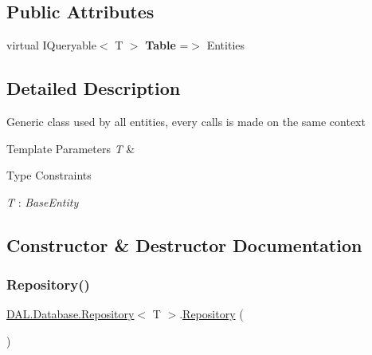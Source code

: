 \subsection*{Public Attributes}
\begin{DoxyCompactItemize}
\item 
\mbox{\label{class_d_a_l_1_1_database_1_1_repository_abb10bb5517401514b62f812635f9fcc1}} 
virtual I\+Queryable$<$ T $>$ {\bfseries Table} =$>$ Entities
\end{DoxyCompactItemize}


\subsection{Detailed Description}
Generic class used by all entities, every calls is made on the same context 


\begin{DoxyTemplParams}{Template Parameters}
{\em T} & \\
\hline
\end{DoxyTemplParams}
\begin{Desc}
\item[Type Constraints]\begin{description}
\item[{\em T} : {\em Base\+Entity}]\end{description}
\end{Desc}


\subsection{Constructor \& Destructor Documentation}
\mbox{\label{class_d_a_l_1_1_database_1_1_repository_a937df992bda81edb925ddc7ffd731f0c}} 
\subsubsection{\texorpdfstring{Repository()}{Repository()}}
{\footnotesize\ttfamily \hyperlink{class_d_a_l_1_1_database_1_1_repository}{D\+A\+L.\+Database.\+Repository}$<$ T $>$.\hyperlink{class_d_a_l_1_1_database_1_1_repository}{Repository} (\begin{DoxyParamCaption}{ }\end{DoxyParamCaption})}



